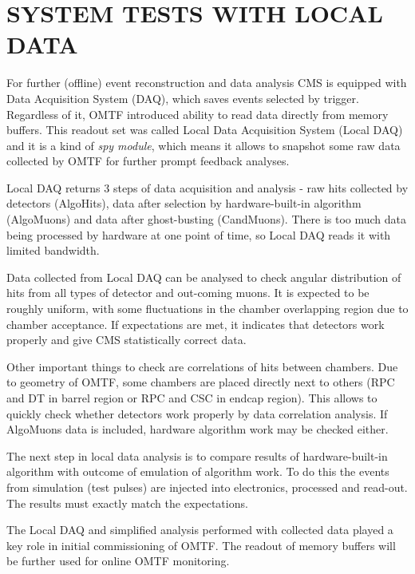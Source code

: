 \section{SYSTEM TESTS WITH LOCAL DATA}

For further (offline) event reconstruction and data analysis CMS is 
equipped with Data Acquisition
System (DAQ), which saves events selected by trigger. Regardless of
it, OMTF introduced ability to read data directly from memory buffers.
This readout set was called Local Data Acquisition System (Local DAQ)
and it is a kind of \textit{spy module}, which means it allows to snapshot
some raw data collected by OMTF  for further prompt feedback analyses.

Local DAQ returns 3 steps of data acquisition and analysis - raw hits
collected by detectors (AlgoHits), data after selection by hardware-built-in
algorithm (AlgoMuons) and data after ghost-busting (CandMuons). There
is too much data being processed by hardware at one point of time,
so Local DAQ reads it with limited bandwidth.

Data collected from Local DAQ can be analysed to check angular distribution
of hits from all types of detector and out-coming muons. 
It is expected to be roughly uniform, with some
fluctuations in the chamber overlapping region due to chamber acceptance. 
If expectations are
met, it indicates that detectors work properly and give CMS statistically
correct data.

Other important things to check are correlations of hits between chambers.
Due to geometry of OMTF, some chambers are placed directly next to
others (RPC and DT in barrel region or RPC and CSC in endcap region).
This allows to quickly check whether detectors work properly by data correlation
analysis. If AlgoMuons data is included, hardware algorithm work may
be checked either.

The next step in local data analysis is to compare results of hardware-built-in
algorithm with outcome of emulation of algorithm work. To do this the events
from simulation (test pulses) are injected into electronics, processed and
read-out. The results must exactly match the expectations.

The Local DAQ and simplified analysis performed with collected data played 
a key role in initial commissioning of OMTF. The readout of memory buffers 
will be further used for online OMTF monitoring.
